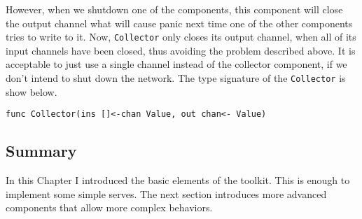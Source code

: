 However, when we shutdown
one of the components, this component will close the output channel
what will cause panic next time one of the other components tries to write
to it. Now, \texttt{Collector} only closes its output channel, when
all of its input channels have been closed, thus avoiding the problem 
described above. It is acceptable to just use a single channel instead of
the collector component, if we don't intend to shut down the network.
The type signature of the \texttt{Collector} is show below.
\begin{lstlisting}
func Collector(ins []<-chan Value, out chan<- Value)
\end{lstlisting}


\subsection{Summary}
In this Chapter I introduced the basic elements of the toolkit. This 
is enough to implement some simple serves. The next section introduces
more advanced components that allow more complex behaviors.


